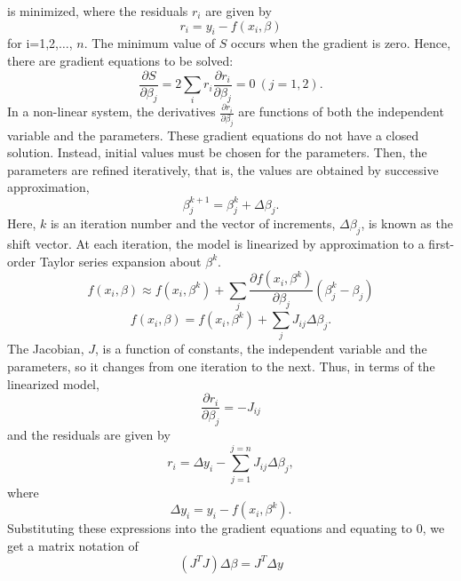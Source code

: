 \documentclass[journal]{IEEEtran}
\begin{document}
is minimized, where the residuals $r_i$ are given by
\begin{equation}
    r_i = y_i - f(x_i,\beta)
\end{equation}
for i=1,2,$\dots$, $n$.
\newline
The minimum value of $S$ occurs when the gradient is zero. Hence, there are gradient equations to be solved:
\begin{equation}
    \frac{\partial S}{\partial \beta_j}=2\sum_i r_i\frac{\partial r_i}{\partial \beta_j}=0 \ (j=1,2).
\end{equation}
In a non-linear system, the derivatives $\frac{\partial r_i}{\partial \beta_j}$ are functions of both the independent
variable and the parameters. These gradient equations do not have a
closed solution. Instead, initial values must be chosen for the
parameters. Then, the parameters are refined iteratively, that is,
the values are obtained by successive approximation,
\begin{equation}
    \beta_j^{k+1}=\beta^k_j+\Delta \beta_j.
\end{equation}
Here, $k$ is an iteration number and the vector of increments, $\Delta \beta_j$, is known as the shift vector. At each iteration,
the model is linearized by approximation to a first-order Taylor series expansion about $\beta^k$.
\begin{equation}
    f(x_i,\beta)\approx f(x_i,\beta^k) +\sum_j \frac{\partial f(x_i, \beta^k)}{\partial \beta_j} \left(\beta^k_j -\beta_j \right)
\end{equation}
\begin{equation}
 f(x_i,\beta) =f(x_i, \beta^k)+\sum_j J_{ij} \Delta\beta_j.
\end{equation}
The Jacobian, $J$, is a function of constants, the independent
variable and the parameters, so it changes from one iteration to the
next. Thus, in terms of the linearized model,
\begin{equation}
\frac{\partial r_i}{\partial \beta_j}=-J_{ij}
\end{equation}
and the residuals are given by
\begin{equation}
    r_i=\Delta y_i- \sum_{j=1}^{j=n} J_{ij}\Delta\beta_j,
\end{equation}
where
\begin{equation}
 \Delta y_i=y_i- f(x_i, \beta^k).
\end{equation}
Substituting these expressions into the gradient equations and
equating to $0$, we get a matrix notation of
\begin{equation}
    \left(J^TJ\right)\Delta  \beta=J^T\Delta y
\end{equation}
\end{document}
